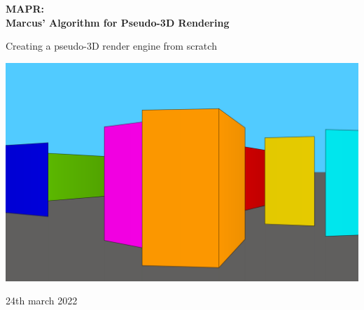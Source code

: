 \begin{titlepage}
	\begin{center}
		\vspace*{1cm}

		\Huge
		\textbf{MAPR: \\ Marcus' Algorithm for Pseudo-3D Rendering}

		\vspace{0.5cm}
		\LARGE
		Creating a pseudo-3D render engine from scratch

		\vspace{1.5cm}

		\textbf{\myauthor}

		\includegraphics{../img/CoverPic/Main_Pic4.png}

		\vfill
				
		\vspace{0.8cm}
		
		\Large
		24th march 2022
	\end{center}
\end{titlepage}



\thispagestyle{empty}
